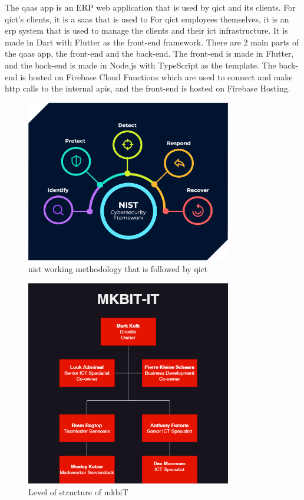 \begin{multicols}{2}
      The \acrshort{qaas} app is an \gls{ERP} web application that is used by \acrshort{qict} and its clients.
      For \acrshort{qict}'s clients, it is a \acrshort{saas} that is used to
      For \acrshort{qict} employees themselves, it is an \acrshort{erp} system that is used to manage the clients and their
      \acrshort{ict} infrastructure. It is made in Dart with Flutter as the front-end framework. There are 2 main parts of the
      \acrshort{qaas} app, the front-end and the back-end. The front-end is made in Flutter, and the back-end is made in Node.js with
      TypeScript as the template. The back-end is hosted on Firebase Cloud Functions which are used to connect and make \acrshort{http}
      calls to the internal \acrshort{api}s, and the front-end is hosted on Firebase Hosting.
\end{multicols}

\begin{figure}[htbp]
      \centering
      \includegraphics[width=0.8\textwidth]{Figures/qict-working-method.png}
      \caption{\acrshort{nist} working methodology that is followed by \acrshort{qict}}
\end{figure}

\begin{figure}[htbp]
      \centering
      \includegraphics[width=0.8\textwidth]{Figures/Organogram-MKBiT.png}
      \caption{Level of structure of \acrshort{mkb}iT}
\end{figure}


